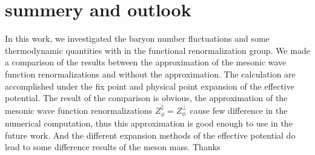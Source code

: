\documentclass[%
reprint,
superscriptaddress,
showpacs,preprintnumbers,
 amsmath,amssymb,
 aps,
prd,
]{revtex4-1}
\begin{document}
\section{summery and outlook}
In this work, we investigated the baryon number fluctuations and some thermodynamic quantities with in the functional 
renormalization group. We made a comparison of the results between the approximation of the mesonic wave function 
renormalizations and without the approximation. The calculation are accomplished under the fix point and physical point expansion of 
the effective potential. The result of the comparison is obvious, the approximation of the mesonic wave function renormalizations 
$Z^{\|}_{\phi}=Z^{\bot}_{\phi}$ cause few difference in the numerical computation, thus this approximation is good enough to use in 
the future work. And the different expansion methods of the effective potential do lead to some difference results of the meson mass.
\acknowledgments
Thanks



\appendix
\end{document}
